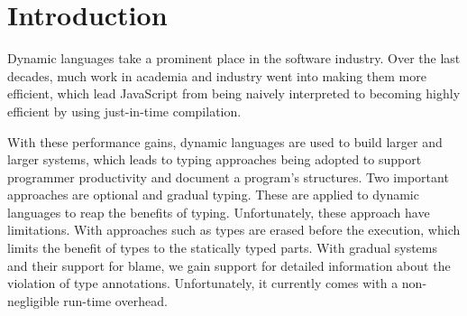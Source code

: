 
\section{Introduction}
\label{sec:introduction}

%
%

Dynamic languages take a prominent place in the software industry.
Over the last decades, much work in academia and industry
went into making them more efficient\citep{Self,Bolz2013,Bolz:2013:IMT,Wurthinger:2017:PPE,Daloze2016,Clifford:2015:MM,Degenbaev:2016:ITG},
which lead JavaScript from being naively interpreted
to becoming highly efficient by using just-in-time compilation.


With these performance gains,
dynamic languages are used to build larger and larger systems,
which leads to typing approaches being adopted
to support programmer productivity and document a program's structures.
Two important approaches are optional\citep{Bracha:04:PT}
and gradual typing\citep{Siek2006,Siek2015}.
These are applied to dynamic languages to reap the benefits of typing.
Unfortunately, these approach have limitations.
With approaches such as 
types are erased before the execution,
which limits the benefit of types to the statically typed parts.
With gradual systems and their support for blame,
we gain support for detailed information
about the violation of type annotations.
Unfortunately, it currently comes with a non-negligible run-time overhead\citep{Takikawa2016,Vitousek2017,Muehlboeck2017,Bauman2017,Richards2017,Stulova2016,Greenman2018}.

